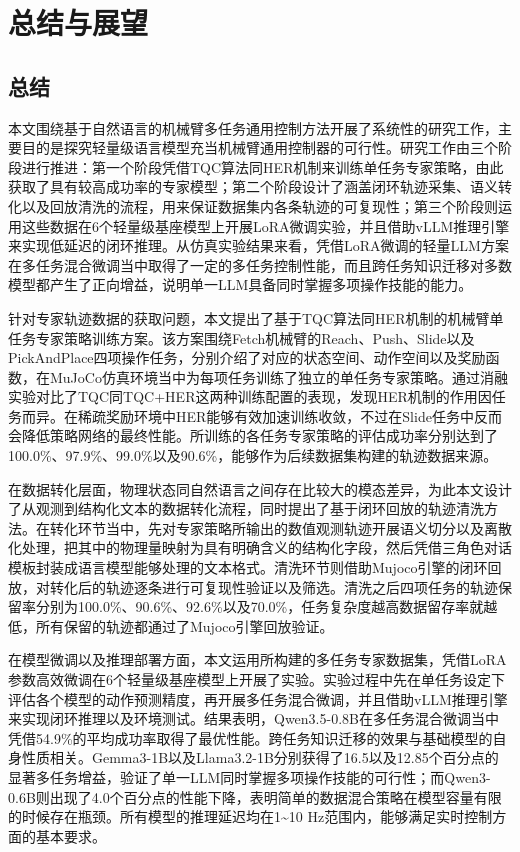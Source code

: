 \chapter{总结与展望}\label{chap:conclusion}

\section{总结}\label{sec:conclusion-summary}

本文围绕基于自然语言的机械臂多任务通用控制方法开展了系统性的研究工作，主要目的是探究轻量级语言模型充当机械臂通用控制器的可行性。研究工作由三个阶段进行推进：第一个阶段凭借TQC算法同HER机制来训练单任务专家策略，由此获取了具有较高成功率的专家模型；第二个阶段设计了涵盖闭环轨迹采集、语义转化以及回放清洗的流程，用来保证数据集内各条轨迹的可复现性；第三个阶段则运用这些数据在6个轻量级基座模型上开展LoRA微调实验，并且借助vLLM推理引擎来实现低延迟的闭环推理。从仿真实验结果来看，凭借LoRA微调的轻量LLM方案在多任务混合微调当中取得了一定的多任务控制性能，而且跨任务知识迁移对多数模型都产生了正向增益，说明单一LLM具备同时掌握多项操作技能的能力。

针对专家轨迹数据的获取问题，本文提出了基于TQC算法同HER机制的机械臂单任务专家策略训练方案。该方案围绕Fetch机械臂的Reach、Push、Slide以及PickAndPlace四项操作任务，分别介绍了对应的状态空间、动作空间以及奖励函数，在MuJoCo仿真环境当中为每项任务训练了独立的单任务专家策略。通过消融实验对比了TQC同TQC+HER这两种训练配置的表现，发现HER机制的作用因任务而异。在稀疏奖励环境中HER能够有效加速训练收敛，不过在Slide任务中反而会降低策略网络的最终性能。所训练的各任务专家策略的评估成功率分别达到了100.0\%、97.9\%、99.0\%以及90.6\%，能够作为后续数据集构建的轨迹数据来源。

在数据转化层面，物理状态同自然语言之间存在比较大的模态差异，为此本文设计了从观测到结构化文本的数据转化流程，同时提出了基于闭环回放的轨迹清洗方法。在转化环节当中，先对专家策略所输出的数值观测轨迹开展语义切分以及离散化处理，把其中的物理量映射为具有明确含义的结构化字段，然后凭借三角色对话模板封装成语言模型能够处理的文本格式。清洗环节则借助Mujoco引擎的闭环回放，对转化后的轨迹逐条进行可复现性验证以及筛选。清洗之后四项任务的轨迹保留率分别为100.0\%、90.6\%、92.6\%以及70.0\%，任务复杂度越高数据留存率就越低，所有保留的轨迹都通过了Mujoco引擎回放验证。

在模型微调以及推理部署方面，本文运用所构建的多任务专家数据集，凭借LoRA参数高效微调在6个轻量级基座模型上开展了实验。实验过程中先在单任务设定下评估各个模型的动作预测精度，再开展多任务混合微调，并且借助vLLM推理引擎来实现闭环推理以及环境测试。结果表明，Qwen3.5-0.8B在多任务混合微调当中凭借54.9\%的平均成功率取得了最优性能。跨任务知识迁移的效果与基础模型的自身性质相关。Gemma3-1B以及Llama3.2-1B分别获得了16.5以及12.85个百分点的显著多任务增益，验证了单一LLM同时掌握多项操作技能的可行性；而Qwen3-0.6B则出现了4.0个百分点的性能下降，表明简单的数据混合策略在模型容量有限的时候存在瓶颈。所有模型的推理延迟均在1\textasciitilde10 Hz范围内，能够满足实时控制方面的基本要求。

